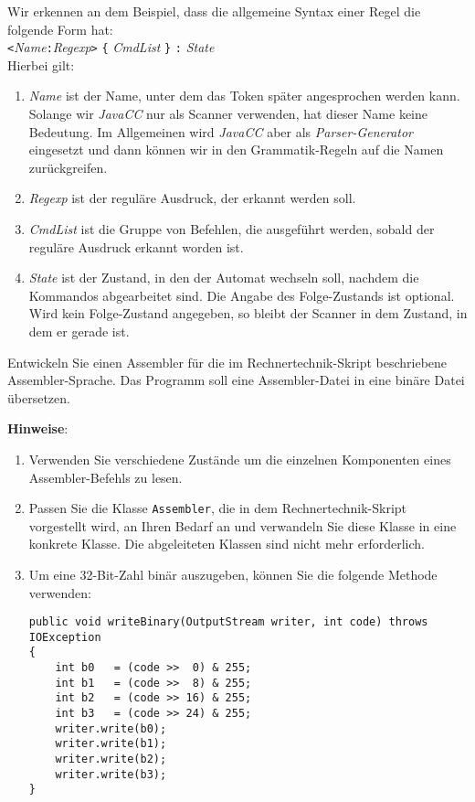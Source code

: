 Wir erkennen an dem Beispiel, dass die allgemeine Syntax einer Regel die folgende 
Form hat:
\\[0.2cm]
\hspace*{1.3cm}
\texttt{<}\textsl{Name}\texttt{:}\textsl{Regexp}\texttt{>} 
\texttt{\{} \textsl{CmdList} \texttt{\}} \texttt{:} \textsl{State}
\\[0.2cm]
Hierbei gilt:
\begin{enumerate}
\item \textsl{Name} ist der Name, unter dem das Token sp\"ater angesprochen werden kann.
      Solange wir \textsl{JavaCC}\/ nur als Scanner verwenden, hat dieser Name keine
      Bedeutung.  Im Allgemeinen wird \textsl{JavaCC}\/ aber als \emph{Parser-Generator}
      eingesetzt und dann k\"onnen wir in den Grammatik-Regeln auf die Namen zur\"uckgreifen.
\item \textsl{Regexp} ist der regul\"are Ausdruck, der erkannt werden soll.
\item \textsl{CmdList} ist die Gruppe von Befehlen, die ausgef\"uhrt werden, sobald der regul\"are
      Ausdruck erkannt worden ist.
\item \textsl{State} ist der Zustand, in den der Automat wechseln soll, nachdem die
      Kommandos abgearbeitet sind.  Die Angabe des Folge-Zustands ist optional.
      Wird kein Folge-Zustand angegeben, so bleibt der Scanner in dem Zustand, in dem er
      gerade ist.
\end{enumerate}
\pagebreak

\exercise
Entwickeln Sie einen Assembler f\"ur die im Rechnertechnik-Skript
beschriebene Assembler-Sprache.  Das Programm soll eine Assembler-Datei in eine bin\"are
Datei \"ubersetzen.
\vspace*{0.3cm}

\noindent
\textbf{Hinweise}:  
\begin{enumerate}
\item Verwenden Sie verschiedene Zust\"ande um die einzelnen Komponenten eines Assembler-Befehls
      zu lesen.
\item Passen Sie die Klasse \texttt{Assembler}, die in dem
      Rechnertechnik-Skript vorgestellt wird, an Ihren Bedarf an und verwandeln Sie diese Klasse
      in eine konkrete Klasse.  Die abgeleiteten Klassen sind nicht mehr erforderlich.
\item Um eine 32-Bit-Zahl bin\"ar auszugeben, k\"onnen Sie die folgende Methode verwenden:
      \begin{verbatim}
public void writeBinary(OutputStream writer, int code) throws IOException
{
    int b0   = (code >>  0) & 255;
    int b1   = (code >>  8) & 255;
    int b2   = (code >> 16) & 255;
    int b3   = (code >> 24) & 255;
    writer.write(b0);
    writer.write(b1);
    writer.write(b2);
    writer.write(b3);
}
\end{verbatim}

\end{enumerate}

